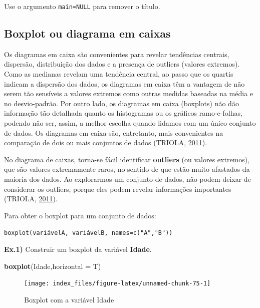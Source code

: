 \documentclass[12pt,brazil,]{book}
\newenvironment{Shaded}{\begin{snugshade}}{\end{snugshade}}
\newcommand{\DataTypeTok}[1]{\textcolor[rgb]{0.13,0.29,0.53}{#1}}
\newcommand{\KeywordTok}[1]{\textcolor[rgb]{0.13,0.29,0.53}{\textbf{#1}}}
\newcommand{\NormalTok}[1]{#1}
\begin{document}
Use o argumento \texttt{main=NULL} para remover o título.

\hypertarget{boxplot-ou-diagrama-em-caixas}{%
\subsection{Boxplot ou diagrama em
caixas}\label{boxplot-ou-diagrama-em-caixas}}

Os diagramas em caixa são convenientes para revelar tendências centrais,
dispersão, distribuição dos dados e a presença de outliers (valores
extremos). Como as medianas revelam uma tendência central, ao passo que
os quartis indicam a dispersão dos dados, os diagramas em caixa têm a
vantagem de não serem tão sensíveis a valores extremos como outras
medidas baseadas na média e no desvio-padrão. Por outro lado, os
diagramas em caixa (boxplots) não dão informação tão detalhada quanto os
histogramas ou os gráficos ramo-e-folhas, podendo não ser, assim, a
melhor escolha quando lidamos com um único conjunto de dados. Os
diagramas em caixa são, entretanto, mais convenientes na comparação de
dois ou mais conjuntos de dados (TRIOLA,
\protect\hyperlink{ref-triola1999}{2011}).

No diagrama de caixas, torna-se fácil identificar \textbf{outliers} (ou
valores extremos), que são valores extremamente raros, no sentido de que
estão muito afastados da maioria dos dados. Ao explorarmos um conjunto
de dados, não podem deixar de considerar os outliers, porque eles podem
revelar informações importantes (TRIOLA,
\protect\hyperlink{ref-triola1999}{2011}).

Para obter o boxplot para um conjunto de dados:

\texttt{boxplot(variávelA,\ variávelB,\ names=c("A","B"))}

\textbf{Ex.1)} Construir um boxplot da variável \textbf{Idade}.

\begin{Shaded}
\begin{Highlighting}[]
\KeywordTok{boxplot}\NormalTok{(Idade,}\DataTypeTok{horizontal =}\NormalTok{ T)}
\end{Highlighting}
\end{Shaded}

\begin{figure}

{\centering \texttt{[image: index\_files/figure-latex/unnamed-chunk-75-1]} 

}

\caption{Boxplot com a variável Idade}\label{fig:unnamed-chunk-75}
\end{figure}
\end{document}
